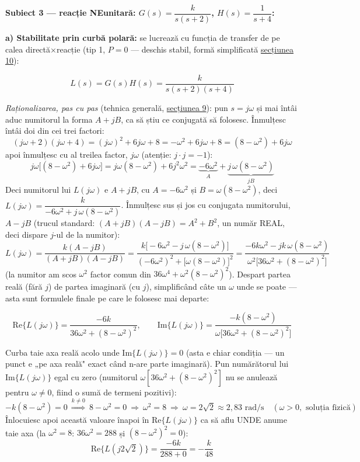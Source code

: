 \documentclass[10pt,a4paper]{article}
\begin{document}
\textbf{Subiect 3 — reacție NEunitară: $G(s)=\dfrac{k}{s(s+2)}$, $H(s)=\dfrac1{s+4}$:}

\textbf{a) Stabilitate prin curbă polară:} se lucrează cu funcția de transfer de pe calea directă$\times$reacție (tip 1, $P{=}0$ — deschis stabil, formă simplificată \hyperref[sec:10]{secțiunea 10}):
\begin{keyeq}\color{red!65!black}
$$L(s)=G(s)H(s)=\dfrac{k}{s(s+2)(s+4)}$$
\end{keyeq}

\textit{Raționalizarea, pas cu pas} (tehnica generală, \hyperref[sec:9]{secțiunea 9}): pun $s=j\omega$ și mai întâi aduc numitorul la forma $A+jB$, ca să știu ce conjugată să folosesc. Înmulțesc întâi doi din cei trei factori:
$$(j\omega+2)(j\omega+4)=(j\omega)^2+6j\omega+8=-\omega^2+6j\omega+8=(8-\omega^2)+6j\omega$$
apoi înmulțesc cu al treilea factor, $j\omega$ (atenție: $j\cdot j={-}1$):
$$j\omega\big[(8-\omega^2)+6j\omega\big]=j\omega(8-\omega^2)+6j^2\omega^2=\underbrace{-6\omega^2}_{A}+\underbrace{j\,\omega(8-\omega^2)}_{jB}$$
Deci numitorul lui $L(j\omega)$ e $A+jB$, cu $A={-}6\omega^2$ și $B=\omega(8{-}\omega^2)$, deci $L(j\omega)=\dfrac{k}{-6\omega^2+j\,\omega(8-\omega^2)}$. Înmulțesc sus și jos cu conjugata numitorului, $A-jB$ (trucul standard: $(A{+}jB)(A{-}jB)=A^2{+}B^2$, un număr REAL, deci dispare $j$-ul de la numitor):
$$L(j\omega)=\dfrac{k(A-jB)}{(A+jB)(A-jB)}=\dfrac{k\big[-6\omega^2-j\,\omega(8-\omega^2)\big]}{(-6\omega^2)^2+\big[\omega(8-\omega^2)\big]^2}=\dfrac{-6k\omega^2-jk\,\omega(8-\omega^2)}{\omega^2\big[36\omega^2+(8-\omega^2)^2\big]}$$
(la numitor am scos $\omega^2$ factor comun din $36\omega^4+\omega^2(8{-}\omega^2)^2$). Despart partea reală (fără $j$) de partea imaginară (cu $j$), simplificând câte un $\omega$ unde se poate — asta sunt formulele finale pe care le folosesc mai departe:
\begin{keyeq}\color{red!65!black}
$$\mathrm{Re}\{L(j\omega)\}=\dfrac{-6k}{36\omega^2+(8-\omega^2)^2},\qquad \mathrm{Im}\{L(j\omega)\}=\dfrac{-k(8-\omega^2)}{\omega\big[36\omega^2+(8-\omega^2)^2\big]}$$
\end{keyeq}

Curba taie axa reală acolo unde $\mathrm{Im}\{L(j\omega)\}=0$ (asta e chiar condiția — un punct e „pe axa reală" exact când n-are parte imaginară). Pun numărătorul lui $\mathrm{Im}\{L(j\omega)\}$ egal cu zero (numitorul $\omega[36\omega^2{+}(8{-}\omega^2)^2]$ nu se anulează pentru $\omega\ne0$, fiind o sumă de termeni pozitivi):
$$-k(8-\omega^2)=0\ \overset{k\ne0}{\Longrightarrow}\ 8-\omega^2=0\ \Rightarrow\ \omega^2=8\ \Rightarrow\ \omega=2\sqrt2\approx2{,}83\text{ rad/s}\quad(\omega{>}0,\text{ soluția fizică})$$
Înlocuiesc apoi această valoare înapoi în $\mathrm{Re}\{L(j\omega)\}$ ca să aflu UNDE anume taie axa (la $\omega^2{=}8$: $36\omega^2{=}288$ și $(8{-}\omega^2)^2{=}0$):
$$\mathrm{Re}\{L(j2\sqrt2)\}=\dfrac{-6k}{288+0}=-\dfrac{k}{48}$$
\end{document}
